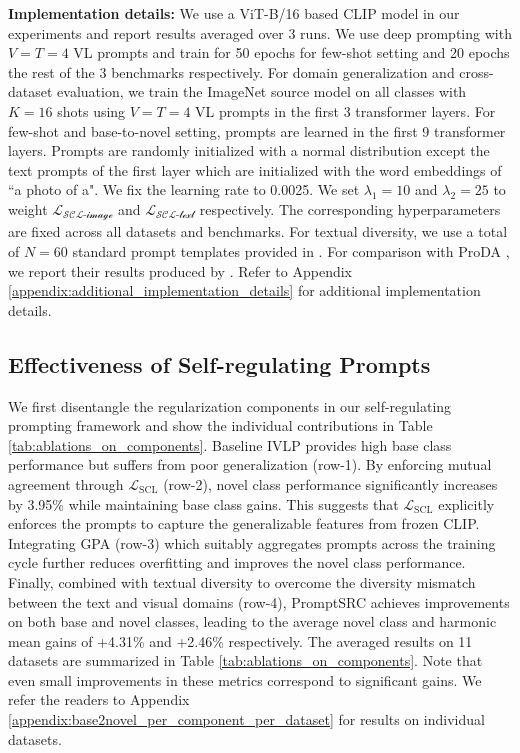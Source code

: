 \documentclass[10pt,twocolumn,letterpaper]{article}
\begin{document}
\noindent \textbf{Implementation details:} We use a ViT-B/16 based CLIP model in our experiments and report results averaged over 3 runs. We use deep prompting with $V=T=4$ VL prompts and train for 50 epochs for few-shot setting and 20 epochs the rest of the 3 benchmarks respectively.  For domain generalization and cross-dataset evaluation, we train the ImageNet source model on all classes with $K=16$ shots using $V=T=4$ VL prompts in the first 3 transformer layers. For few-shot and base-to-novel setting, prompts are learned in the first 9 transformer layers. Prompts are randomly initialized with a normal distribution except the text prompts of the first layer which are initialized with the word embeddings of ``a photo of a". We fix the learning rate to 0.0025. We set $\lambda_{1}=10$ and $\lambda_{2}=25$ to weight $\mathcal{L_{\text{SCL-image}}}$ and $\mathcal{L_{\text{SCL-text}}}$ respectively. The corresponding hyperparameters are fixed across all datasets and benchmarks. For textual diversity, we use a total of $N=60$ standard prompt templates provided in \cite{radford2021learning}. For comparison with ProDA \cite{lu2022prompt}, we report their results produced by \cite{derakhshani2022variational}. Refer to Appendix \ref{appendix:additional_implementation_details} for additional implementation details.
\subsection{Effectiveness of Self-regulating Prompts}
We first disentangle the regularization components in our self-regulating prompting framework and show the individual contributions in Table \ref{tab:ablations_on_components}.
Baseline IVLP provides high base class performance but suffers from poor generalization (row-1). By enforcing mutual agreement through $\mathcal{L}_\text{SCL}$ (row-2), novel class performance significantly increases by 3.95\% while maintaining base class gains. This suggests that $\mathcal{L}_\text{SCL}$ explicitly enforces the prompts to capture the generalizable features from frozen CLIP. 
Integrating GPA (row-3) which suitably aggregates prompts across the training cycle further reduces overfitting and improves the novel class performance. Finally, combined with textual diversity to overcome the diversity mismatch between the text and visual domains (row-4), PromptSRC achieves improvements on both base and novel classes, leading to the average novel class and harmonic mean gains of +4.31\% and +2.46\% respectively. The averaged results on 11 datasets are summarized in Table \ref{tab:ablations_on_components}. Note that even small improvements in these metrics correspond to significant gains. We refer the readers to Appendix \ref{appendix:base2novel_per_component_per_dataset} for results on individual datasets.
\end{document}
